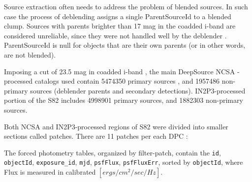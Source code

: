 \documentclass[fleqn,usenatbib]{mnras}  %
\begin{document}
Source extraction often needs to address the problem of blended sources.  In such case the process of deblending assigns a single ParentSourceId to a blended clump. Sources with parents brighter than  17 mag in the coadded i-band are considered unreliable, since they were not handled well by the deblender . ParentSourceId is null for objects that are their own parents (or in other words, are not blended). 

Imposing a cut of 23.5 mag in coadded i-band , the main DeepSource NCSA -processed catalogs used contain 5474350 primary sources , and 1957486 non-primary sources (deblender parents and secondary detections). IN2P3-processed portion of the S82 includes 4998901 primary sources, and 1882303 non-primary sources.   

Both NCSA and IN2P3-processed  regions of S82 were divided into smaller sections called patches. There are 11 patches per each DPC : 

The forced photometry tables, organized by filter-patch, contain the \verb|id|, \verb|objectId|, \verb|exposure_id|, \verb|mjd|, \verb|psfFlux|, \verb|psfFluxErr|, sorted by \verb|objectId|, where Flux is measured in calibrated $[ergs/ cm^{2} / sec / Hz]$.  





















\bsp	%
\label{lastpage}
\end{document}
